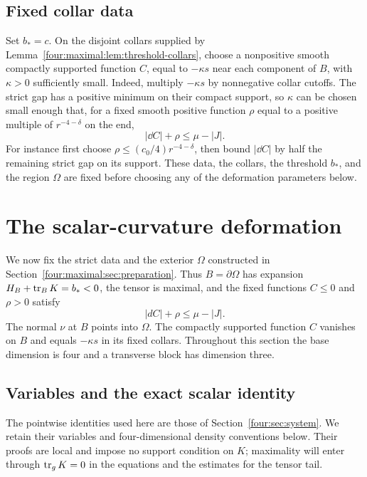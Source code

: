 \subsection{Fixed collar data}

Set \(b_*=c\).  On the disjoint collars supplied by
Lemma~\ref{four:maximal:lem:threshold-collars}, choose a nonpositive smooth
compactly supported function \(C\), equal to \(-\kappa s\)
near each component of \(B\), with \(\kappa>0\) sufficiently
small.  Indeed, multiply \(-\kappa s\) by nonnegative collar
cutoffs.  The strict gap has a positive minimum on their compact
support, so \(\kappa\) can be chosen small enough that, for a
fixed smooth positive function \(\rho\) equal to a positive
multiple of \(r^{-4-\delta}\) on the end,
\begin{equation}
 |\dd C|+\rho\le\mu-|J|.
\label{four:maximal:prep:offset-slack}
\end{equation}
For instance first choose \(\rho\le(c_0/4)r^{-4-\delta}\),
then bound \(|\dd C|\) by half the remaining strict gap on its
support.  These data, the collars, the threshold \(b_*\), and
the region \(\Omega\) are fixed before choosing any of the
deformation parameters below.

\section{The scalar-curvature deformation}\label{four:maximal:sec:deformation}

We now fix the strict data and the exterior $\Omega$ constructed in
Section~\ref{four:maximal:sec:preparation}.  Thus $B=\partial\Omega$ has expansion
$H_B+\operatorname{tr}_BK=b_*<0$, the tensor is maximal, and the fixed functions $C\le0$
and $\rho>0$ satisfy
\begin{equation}\label{four:maximal:def:slack}
 |dC|+\rho\le\mu-|J|.
\end{equation}
The normal $\nu$ at $B$ points into $\Omega$.  The compactly supported
function $C$ vanishes on $B$ and equals $-\kappa s$ in its fixed collars.
Throughout this section the base dimension is four and a transverse block
has dimension three.

\subsection{Variables and the exact scalar identity}

The pointwise identities used here are those of
Section~\ref{four:sec:system}.  We retain their variables and
four-dimensional density conventions below.  Their proofs are local
and impose no support condition on $K$; maximality will enter through
$\operatorname{tr}_gK=0$ in the equations and the estimates for the tensor tail.

